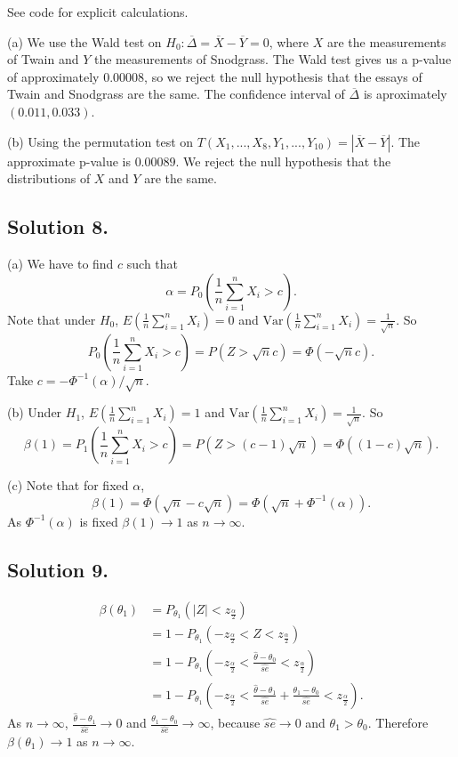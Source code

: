 See code for explicit calculations.

(a) We use the Wald test on $H_0: \overline{\Delta} = \overline{X} - \overline{Y} = 0$, where $X$ are the measurements of Twain and $Y$ the measurements of Snodgrass.
The Wald test gives us a p-value of approximately $0.00008$, so we reject the null hypothesis that the essays of Twain and Snodgrass are the same.
The confidence interval of $\overline{\Delta}$ is aproximately $(0.011, 0.033)$.

(b) Using the permutation test on $T(X_1, ..., X_8, Y_1, ..., Y_{10}) = |\overline{X} - \overline{Y}|$.
The approximate p-value is $0.00089$.
We reject the null hypothesis that the distributions of $X$ and $Y$ are the same.


\subsection*{Solution 8.}

(a) We have to find $c$ such that
$$
\alpha = P_0\left(\frac{1}{n}\sum_{i = 1}^n X_i > c\right).
$$
Note that under $H_0$, $E(\frac{1}{n}\sum_{i = 1}^n X_i) = 0$ and $\mathrm{Var}(\frac{1}{n}\sum_{i = 1}^n X_i) = \frac{1}{\sqrt{n}}$.
So
$$
P_0\left(\frac{1}{n} \sum_{i = 1}^n X_i > c\right) = P(Z > \sqrt{n}c) = \Phi(-\sqrt{n}c).
$$
Take $c = -\Phi^{-1}(\alpha)/\sqrt{n}$.

(b) Under $H_1$, $E(\frac{1}{n} \sum_{i = 1}^n X_i) = 1$ and $\mathrm{Var}(\frac{1}{n} \sum_{i = 1}^n X_i) = \frac{1}{\sqrt{n}}$.
So
$$
\beta(1) = P_1\left(\frac{1}{n} \sum_{i = 1}^n X_i > c\right) = P(Z > (c - 1)\sqrt{n}) = \Phi((1 - c)\sqrt{n}).
$$

(c) Note that for fixed $\alpha$,
$$
\beta(1) = \Phi(\sqrt{n} - c\sqrt{n}) = \Phi(\sqrt{n} + \Phi^{-1}(\alpha)).
$$
As $\Phi^{-1}(\alpha)$ is fixed $\beta(1) \to 1$ as $n \to \infty$.


\subsection*{Solution 9.}
\begin{equation*}
\begin{split}
\beta(\theta_1) &= P_{\theta_1}(|Z| < z_{\frac{\alpha}{2}}) \\
    &= 1 - P_{\theta_1}(-z_{\frac{\alpha}{2}} < Z < z_{\frac{\alpha}{2}}) \\
    &= 1 - P_{\theta_1}\left(-z_{\frac{\alpha}{2}} < \frac{\hat{\theta} - \theta_0}{\hat{se}} < z_{\frac{\alpha}{2}}\right) \\
    &= 1 - P_{\theta_1}\left(-z_{\frac{\alpha}{2}} < \frac{\hat{\theta} - \theta_1}{\hat{se}} + \frac{\theta_1 - \theta_0}{\hat{se}} < z_{\frac{\alpha}{2}}\right).
\end{split}
\end{equation*}
As $n \to \infty$, $\frac{\hat{\theta} - \theta_1}{\hat{se}} \to 0$ and $\frac{\theta_1 - \theta_0}{\hat{se}} \to \infty$, because $\hat{se} \to 0$ and $\theta_1 > \theta_0$.
Therefore $\beta(\theta_1) \to 1$ as $n \to \infty$.


